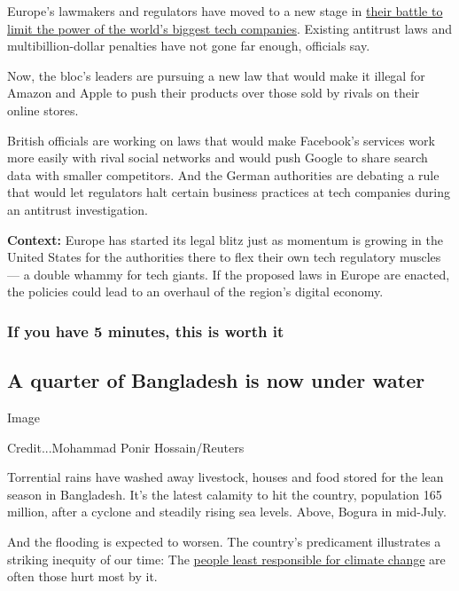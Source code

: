 Europe's lawmakers and regulators have moved to a new stage in
\href{https://www.nytimes.com/2020/07/30/technology/europe-new-phase-tech-amazon-apple-facebook-google.html}{their
battle to limit the power of the world's biggest tech companies}.
Existing antitrust laws and multibillion-dollar penalties have not gone
far enough, officials say.

Now, the bloc's leaders are pursuing a new law that would make it
illegal for Amazon and Apple to push their products over those sold by
rivals on their online stores.

British officials are working on laws that would make Facebook's
services work more easily with rival social networks and would push
Google to share search data with smaller competitors. And the German
authorities are debating a rule that would let regulators halt certain
business practices at tech companies during an antitrust investigation.

\textbf{Context:} Europe has started its legal blitz just as momentum is
growing in the United States for the authorities there to flex their own
tech regulatory muscles --- a double whammy for tech giants. If the
proposed laws in Europe are enacted, the policies could lead to an
overhaul of the region's digital economy.

\hypertarget{if-you-have-5-minutes-this-is-worth-it}{%
\subsubsection{If you have 5 minutes, this is worth
it}\label{if-you-have-5-minutes-this-is-worth-it}}

\hypertarget{a-quarter-of-bangladesh-is-now-under-water}{%
\subsection{A quarter of Bangladesh is now under
water}\label{a-quarter-of-bangladesh-is-now-under-water}}

Image

Credit...Mohammad Ponir Hossain/Reuters

Torrential rains have washed away livestock, houses and food stored for
the lean season in Bangladesh. It's the latest calamity to hit the
country, population 165 million, after a cyclone and steadily rising sea
levels. Above, Bogura in mid-July.

And the flooding is expected to worsen. The country's predicament
illustrates a striking inequity of our time: The
\href{https://www.nytimes.com/2020/07/30/climate/bangladesh-floods.html}{people
least responsible for climate change} are often those hurt most by it.

